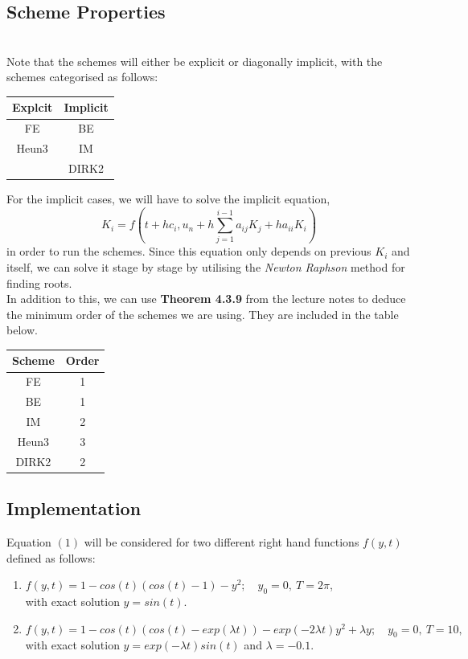 \documentclass[10pt]{article}
\begin{document}
\subsection{Scheme Properties}

\noindent{}\\

Note that the schemes will either be explicit or diagonally implicit, with the schemes categorised as follows:
\begin{center}
 \begin{tabular}{||c | c ||}
 \hline
 Explcit & Implicit  \\ [0.5ex]
 \hline\hline
 FE & BE \\
 Heun3 & IM \\
  & DIRK2 \\
 \hline
\end{tabular}
\end{center}
For the implicit cases, we will have to solve the implicit equation,
\[
K_i = f(t + hc_i, u_n + h \sum_{j=1}^{i-1}a_{ij}K_j + ha_{ii}K_i)
\]
in order to run the schemes. Since this equation only depends on previous $K_i$ and itself, we can solve it stage by stage by utilising the \textit{Newton Raphson} method for finding roots.\\

In addition to this, we can use \textbf{Theorem 4.3.9} from the lecture notes to deduce the minimum order of the schemes we are using. They are included in the table below.

\begin{center}
 \begin{tabular}{||c | c ||}
 \hline
 Scheme & Order  \\ [0.5ex]
 \hline\hline
 FE & 1 \\
 BE & 1 \\
 IM & 2 \\
Heun3 & 3 \\
DIRK2 & 2 \\
 \hline
\end{tabular}
\end{center}

\subsection{Implementation}
Equation $(1)$ will be considered for two different right hand functions $f(y,t)$ defined as follows:
\begin{enumerate}
 \item $f(y,t) = 1 - cos(t)(cos(t)-1) - y^2; \quad y_0=0,~T=2\pi$, \\
 with exact solution $y = sin(t)$.

 \item  $f(y,t) = 1 - cos(t)(cos(t)- exp(\lambda t)) - exp(-2\lambda t)y^2 + \lambda y; \quad y_0=0,~T=10,$
 with exact solution $y = exp(-\lambda t)sin(t)$ and $\lambda = -0.1$.
\end{enumerate}
\end{document}
